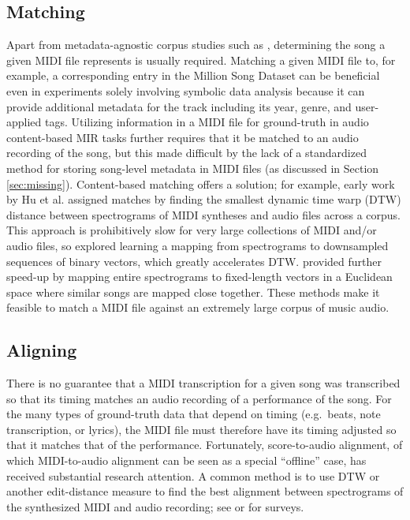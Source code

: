 \documentclass{article}
\begin{document}
\subsection{Matching}

Apart from metadata-agnostic corpus studies such as \cite{mauch2012corpus}, determining the song a given MIDI file represents is usually required.
Matching a given MIDI file to, for example, a corresponding entry in the Million Song Dataset \cite{bertin2011million} can be beneficial even in experiments solely involving symbolic data analysis because it can provide additional metadata for the track including its year, genre, and user-applied tags.
Utilizing information in a MIDI file for ground-truth in audio content-based MIR tasks further requires that it be matched to an audio recording of the song, but this made difficult by the lack of a standardized method for storing song-level metadata in MIDI files (as discussed in Section \ref{sec:missing}).
Content-based matching offers a solution; for example, early work by Hu et al.\cite{hu2003polyphonic} assigned matches by finding the smallest dynamic time warp (DTW) distance between spectrograms of MIDI syntheses and audio files across a corpus.
This approach is prohibitively slow for very large collections of MIDI and/or audio files, so \cite{raffel2015large} explored learning a mapping from spectrograms to downsampled sequences of binary vectors, which greatly accelerates DTW.
\cite{raffel2016pruning} provided further speed-up by mapping entire spectrograms to fixed-length vectors in a Euclidean space where similar songs are mapped close together.
These methods make it feasible to match a MIDI file against an extremely large corpus of music audio.

\subsection{Aligning}

There is no guarantee that a MIDI transcription for a given song was transcribed so that its timing matches an audio recording of a performance of the song.
For the many types of ground-truth data that depend on timing (e.g.\ beats, note transcription, or lyrics), the MIDI file must therefore have its timing adjusted so that it matches that of the performance.
Fortunately, score-to-audio alignment, of which MIDI-to-audio alignment can be seen as a special ``offline'' case, has received substantial research attention. 
A common method is to use DTW or another edit-distance measure to find the best alignment between spectrograms of the synthesized MIDI and audio recording; see \cite{raffel2016optimizing} or \cite{ewert2012towards} for surveys.
\end{document}
